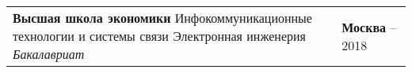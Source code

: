 \documentclass{article}
\begin{document}
\begin{table}[h!]
\begin{center}

\def\arraystretch{1.7}%

\begin{tabular}
{ L{13cm} R{5cm} } \hhline{|=|=|}

\textbf{Высшая школа экономики}\newline
Инфокоммуникационные технологии и системы связи\newline
Электронная инженерия\newline
\emph{Бакалавриат}\newline
& \textbf{Москва} – 2018\\

\end{tabular}
\end{center}
\end{table}
\end{document}
